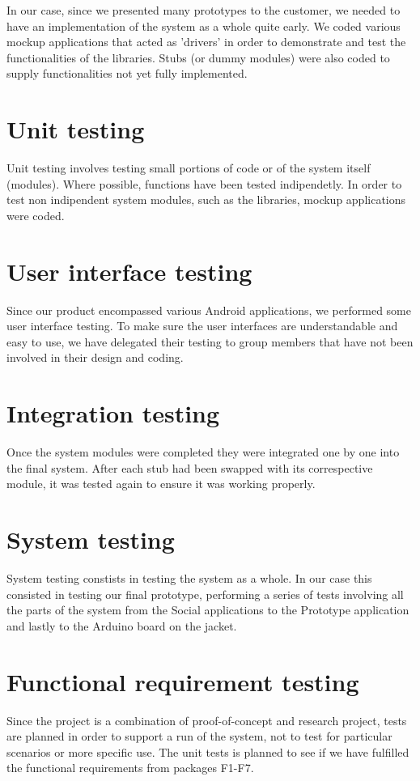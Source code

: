 In our case, since we presented many prototypes to the customer, we needed to have an implementation
of the system as a whole quite early. We coded various mockup applications that acted as 'drivers' in order
to demonstrate and test the functionalities of the libraries. Stubs (or dummy modules) were also coded
to supply functionalities not yet fully implemented.


\section{Unit testing}
Unit testing involves testing small portions of code or of the system itself (modules).
Where possible, functions have been tested indipendetly. In order to test non indipendent system modules,
such as the libraries, mockup applications were coded.

\section{User interface testing}
Since our product encompassed various Android applications, we performed some user interface testing.
To make sure the user interfaces are understandable and easy to use, we have delegated their testing to
group members that have not been involved in their design and coding.

\section{Integration testing}
Once the system modules were completed they were integrated one by one into the final system.
After each stub had been swapped with its correspective module, it was tested again to ensure
it was working properly.

\section{System testing}
System testing constists in testing the system as a whole.
In our case this consisted in testing our final prototype, performing a series of tests involving all
the parts of the system from the Social applications to the Prototype application and lastly to
the Arduino board on the jacket.

\section{Functional requirement testing}
Since the project is a combination of proof-of-concept and research project, tests are planned in order
to support a run of the system, not to test for particular scenarios or more specific use.
The unit tests is planned to see if we have fulfilled the functional requirements from packages F1-F7.

